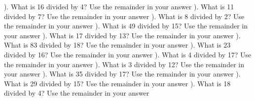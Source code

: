 \documentclass{article}%
\begin{document}
\newline%
\newline%
). What is 16 divided by 4? Use the remainder in your answer%
\newline%
\newline%
). What is 11 divided by 7? Use the remainder in your answer%
\newline%
\newline%
). What is 8 divided by 2? Use the remainder in your answer%
\newline%
\newline%
). What is 49 divided by 15? Use the remainder in your answer%
\newline%
\newline%
). What is 17 divided by 13? Use the remainder in your answer%
\newline%
\newline%
). What is 83 divided by 18? Use the remainder in your answer%
\newline%
\newline%
). What is 23 divided by 16? Use the remainder in your answer%
\newline%
\newline%
). What is 4 divided by 17? Use the remainder in your answer%
\newline%
\newline%
). What is 3 divided by 12? Use the remainder in your answer%
\newline%
\newline%
). What is 35 divided by 17? Use the remainder in your answer%
\newline%
\newline%
). What is 29 divided by 15? Use the remainder in your answer%
\newline%
\newline%
). What is 18 divided by 4? Use the remainder in your answer%
\newline%
\end{document}
